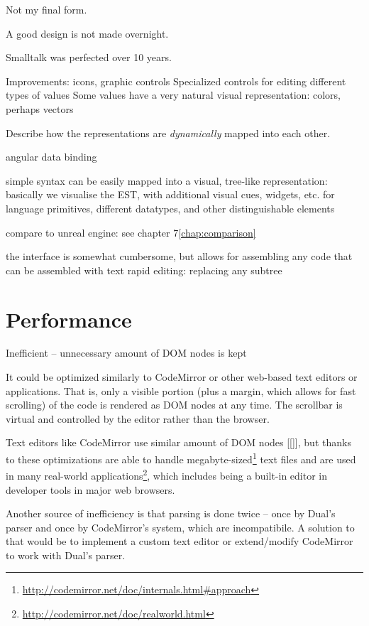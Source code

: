 Not my final form.

A good design is not made overnight.

Smalltalk was perfected over 10 years.

Improvements:
icons, graphic controls
Specialized controls for editing different types of values
Some values have a very natural visual representation:
colors, perhaps vectors



Describe how the representations are \textit{dynamically} mapped into each other. 

angular
data binding

simple syntax can be easily mapped into a visual, tree-like representation:
basically we visualise the EST, with additional visual cues, widgets, etc. for language primitives, different datatypes, and other distinguishable elements

compare to unreal engine:
see chapter 7\ref{chap:comparison}

the interface is somewhat cumbersome, but allows for assembling any code that can be assembled with text
rapid editing: replacing any subtree

\section{Performance}

Inefficient -- unnecessary amount of DOM nodes is kept

It could be optimized similarly to CodeMirror or other web-based text editors or applications. That is, only a visible portion (plus a margin, which allows for fast scrolling) of the code is rendered as DOM nodes at any time. The scrollbar is virtual and controlled by the editor rather than the browser.

Text editors like CodeMirror use similar amount of DOM nodes [[]], but thanks to these optimizations are able to handle megabyte-sized\footnote{\url{http://codemirror.net/doc/internals.html#approach}} text files and are used in many real-world applications\footnote{\url{http://codemirror.net/doc/realworld.html}}, which includes being a built-in editor in developer tools in major web browsers.

Another source of inefficiency is that parsing is done twice -- once by Dual's parser and once by CodeMirror's system, which are incompatibile.
A solution to that would be to implement a custom text editor or extend/modify CodeMirror to work with Dual's parser.

